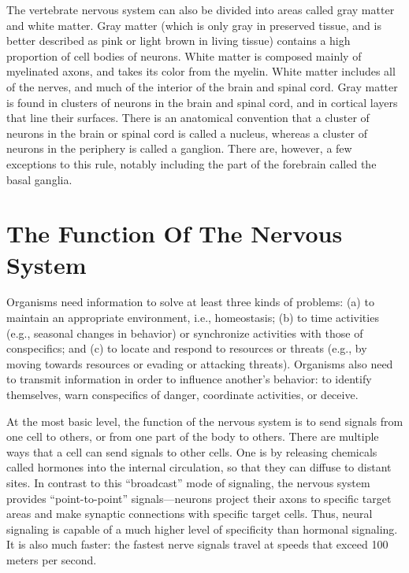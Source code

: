 The vertebrate nervous system can also be divided into areas called gray matter and white matter. Gray matter (which is only gray in preserved tissue, and is better described as pink or light brown in living tissue) contains a high proportion of cell bodies of neurons. White matter is composed mainly of myelinated axons, and takes its color from the myelin. White matter includes all of the nerves, and much of the interior of the brain and spinal cord. Gray matter is found in clusters of neurons in the brain and spinal cord, and in cortical layers that line their surfaces. There is an anatomical convention that a cluster of neurons in the brain or spinal cord is called a nucleus, whereas a cluster of neurons in the periphery is called a ganglion. There are, however, a few exceptions to this rule, notably including the part of the forebrain called the basal ganglia.

\hypertarget{the-function-of-the-nervous-system}{%
\section{The Function Of The Nervous System}\label{the-function-of-the-nervous-system}}

Organisms need information to solve at least three kinds of problems: (a) to maintain an appropriate environment, i.e., homeostasis; (b) to time activities (e.g., seasonal changes in behavior) or synchronize activities with those of conspecifics; and (c) to locate and respond to resources or threats (e.g., by moving towards resources or evading or attacking threats). Organisms also need to transmit information in order to influence another's behavior: to identify themselves, warn conspecifics of danger, coordinate activities, or deceive.

At the most basic level, the function of the nervous system is to send signals from one cell to others, or from one part of the body to others. There are multiple ways that a cell can send signals to other cells. One is by releasing chemicals called hormones into the internal circulation, so that they can diffuse to distant sites. In contrast to this ``broadcast'' mode of signaling, the nervous system provides ``point-to-point'' signals---neurons project their axons to specific target areas and make synaptic connections with specific target cells. Thus, neural signaling is capable of a much higher level of specificity than hormonal signaling. It is also much faster: the fastest nerve signals travel at speeds that exceed 100 meters per second.

